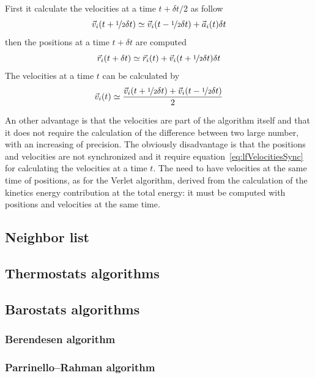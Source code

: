 First it calculate the velocities at a time $t+\delta t/2$ as follow
\begin{equation*}
	\vec v_i(t + \nicefrac{1}{2}\delta t) \simeq \vec v_i(t - \nicefrac{1}{2}\delta t) + \vec a_i(t)\delta t
\end{equation*}
then the positions at a time $t+\delta t$ are computed
\begin{equation*}
	\vec r_i(t + \delta t) \simeq \vec r_i(t) + \vec v_i(t + \nicefrac{1}{2}\delta t)\delta t
\end{equation*}
The velocities at a time $t$ can be calculated by
\begin{equation}
	\vec v_i(t) \simeq \frac{\vec v_i(t + \nicefrac{1}{2}\delta t) + \vec v_i(t - \nicefrac{1}{2}\delta t)}{2}
	\label{eq:lfVelocitiesSync}
\end{equation}

An other advantage is that the velocities are part of the algorithm itself and that it does not require the calculation of the difference between two large number, with an increasing of precision. The obviously disadvantage is that the positions and velocities are not synchronized and it require equation~\eqref{eq:lfVelocitiesSync} for calculating the velocities at a time $t$. The need to have velocities at the same time of positions, as for the Verlet algorithm, derived from the calculation of the kinetics energy contribution at the total energy: it must be computed with positions and velocities at the same time.

	\subsection{Neighbor list}
	\subsection{Thermostats algorithms} %
	\subsection{Barostats algorithms} %
		\subsubsection{Berendesen algorithm}

		\subsubsection{Parrinello--Rahman algorithm}

